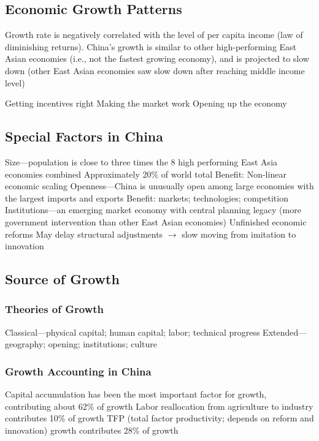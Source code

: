 \documentclass[11pt]{article}
\theoremstyle{definition}
\theoremstyle{remark}
\begin{document}
\subsection{Economic Growth Patterns}
Growth rate is negatively correlated with the level of per capita income (law of diminishing returns). China's growth is similar to other high-performing East Asian economies (i.e., not the fastest growing economy), and is projected to slow down (other East Asian economies saw slow down after reaching middle income level)
\begin{outline}[enumerate]
\1 Getting incentives right
\1 Making the market work
\1 Opening up the economy
\end{outline}


\subsection{Special Factors in China}
\begin{outline}[enumerate]
\1 Size---population is close to three times the 8 high performing East Asia economies combined
	\2 Approximately 20\% of world total
	\2 Benefit: Non-linear economic scaling
\1 Openness---China is unusually open among large economies with the largest imports and exports
	\2 Benefit: markets; technologies; competition
\1 Institutions---an emerging market economy with central planning legacy (more government intervention than other East Asian economies)
	\2 Unfinished economic reforms
	\2 May delay structural adjustments $\to$ slow moving from imitation to innovation
\end{outline}

\subsection{Source of Growth}
\subsubsection{Theories of Growth}
\begin{outline}[enumerate]
\1 Classical---physical capital; human capital; labor; technical progress
\1 Extended---geography; opening; institutions; culture
\end{outline}
\subsubsection{Growth Accounting in China}
\begin{outline}[enumerate]
\1 Capital accumulation has been the most important factor for growth, contributing about 62\% of growth
\1 Labor reallocation from agriculture to industry contributes 10\% of growth
\1 TFP (total factor productivity; depends on reform and innovation) growth contributes 28\% of growth
\end{outline}
\end{document}
